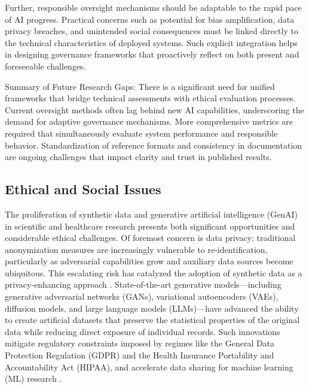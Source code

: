\documentclass[sigconf]{acmart}
\begin{document}
Further, responsible oversight mechanisms should be adaptable to the rapid pace of AI progress. Practical concerns such as potential for bias amplification, data privacy breaches, and unintended social consequences must be linked directly to the technical characteristics of deployed systems. Such explicit integration helps in designing governance frameworks that proactively reflect on both present and foreseeable challenges.

Summary of Future Research Gaps:
There is a significant need for unified frameworks that bridge technical assessments with ethical evaluation processes.
Current oversight methods often lag behind new AI capabilities, underscoring the demand for adaptive governance mechanisms.
More comprehensive metrics are required that simultaneously evaluate system performance and responsible behavior.
Standardization of reference formats and consistency in documentation are ongoing challenges that impact clarity and trust in published results.

\subsection{Ethical and Social Issues}

The proliferation of synthetic data and generative artificial intelligence (GenAI) in scientific and healthcare research presents both significant opportunities and considerable ethical challenges. Of foremost concern is data privacy: traditional anonymization measures are increasingly vulnerable to re-identification, particularly as adversarial capabilities grow and auxiliary data sources become ubiquitous. This escalating risk has catalyzed the adoption of synthetic data as a privacy-enhancing approach \cite{ref8}\cite{ref12}\cite{ref14}\cite{ref16}\cite{ref18}. State-of-the-art generative models—including generative adversarial networks (GANs), variational autoencoders (VAEs), diffusion models, and large language models (LLMs)—have advanced the ability to create artificial datasets that preserve the statistical properties of the original data while reducing direct exposure of individual records. Such innovations mitigate regulatory constraints imposed by regimes like the General Data Protection Regulation (GDPR) and the Health Insurance Portability and Accountability Act (HIPAA), and accelerate data sharing for machine learning (ML) research \cite{ref1}\cite{ref3}\cite{ref7}\cite{ref11}\cite{ref13}\cite{ref14}\cite{ref16}\cite{ref21}.
\end{document}
